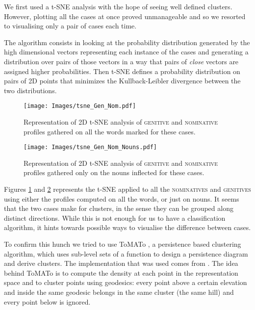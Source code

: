 \documentclass[11pt]{article}
\newcommand{\scsf}[1]{\textsc{\textsf{#1}}} %
\begin{document}
We first used a t-SNE analysis \cite{tSNE} with the hope of seeing well defined clusters.
However, plotting all the cases at once proved unmanageable and so we resorted to visualising only a pair of cases each time.

The algorithm consists in looking at the probability distribution generated by the high dimensional vectors representing each instance of the cases and generating a distribution over pairs of those vectors in a way that pairs of \emph{close} vectors are assigned higher probabilities.
Then t-SNE defines a probability distribution on pairs of 2D points that minimizes the Kullback-Leibler divergence between the two distributions.


\begin{figure}[h]
    \begin{center}
    \texttt{[image: Images/tsne\_Gen\_Nom.pdf]}
    \end{center}
    \caption{Representation of 2D t-SNE analysis of \scsf{genitive} and \scsf{nominative} profiles gathered on all the words marked for these cases.}
    \label{fig:tsne1}
\end{figure}

\begin{figure}[h]
    \begin{center}
    \texttt{[image: Images/tsne\_Gen\_Nom\_Nouns.pdf]}
    \end{center}
    \caption{Representation of 2D t-SNE analysis of \scsf{genitive} and \scsf{nominative} profiles gathered only on the nouns inflected for these cases.}
\label{fig:tsne2}
\end{figure}

Figures \ref{fig:tsne1} and \ref{fig:tsne2} represents the t-SNE applied to all the \scsf{nominatives} and \scsf{genitives} using either the profiles computed on all the words, or just on nouns.
It seems that the two cases make for clusters, in the sense they can be grouped along distinct directions.
While this is not enough for us to have a classification algorithm, it hints towards possible ways to visualise the difference between cases.

To confirm this hunch we tried to use ToMATo \cite{ToMATo}, a persistence based clustering algorithm, which uses sub-level sets of a function to design a persistence diagram and derive clusters.
The implementation that was used comes from .
The idea behind ToMATo is to compute the density at each point in the representation space and to cluster points using geodesics: every point above a certain elevation and inside the same geodesic belongs in the same cluster (the same hill) and every point below is ignored.
\end{document}
